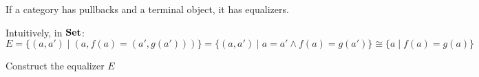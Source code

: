 \begin{lemma}

If a category has pullbacks and a terminal object, it has equalizers.

\begin{center}
\end{center}

\begin{center}
\end{center}

Intuitively, in $\mathbf {Set}$:
$$
  E
  =
  \big\{(a, a') \mid (a, f(a) = (a', g(a')))\big\}
  =
  \big\{(a, a') \mid a = a' \wedge f(a) = g(a')\big\}
  \cong
  \big\{a \mid f(a) = g(a)\big\}
$$

\end{lemma}

\begin{exercise}
Construct the equalizer $E$
\end{exercise}
